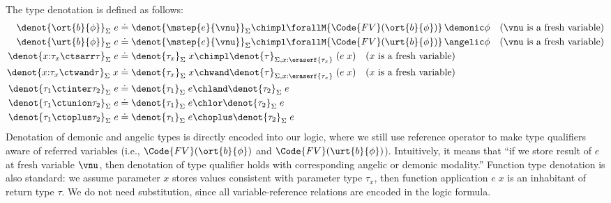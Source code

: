 \begin{definition}
\begin{definition} The type denotation is defined as follows:
\begin{align*}
  \denot{\ort{b}{\phi}}_\Sigma\;e &\doteq \denot{\mstep{e}{\vnu}}_\Sigma \chimpl \forallM{\Code{FV}(\ort{b}{\phi})}\, \demonic \phi \quad \text{($\vnu$ is a fresh variable)}
  \\\denot{\urt{b}{\phi}}_\Sigma\;e &\doteq \denot{\mstep{e}{\vnu}}_\Sigma \chimpl \forallM{\Code{FV}(\urt{b}{\phi})}\, \angelic \phi \quad \text{($\vnu$ is a fresh variable)}
  \\\denot{x{:}\tau_x \ctsarr \tau}_\Sigma\;e &\doteq \denot{\tau_x}_\Sigma\;x \chimpl \denot{\tau}_{\Sigma,x{:}\eraserf{\tau_x}}\;(e\;x) \quad \text{($x$ is a fresh variable)}
  \\\denot{x{:}\tau_x \ctwand \tau}_\Sigma\;x &\doteq \denot{\tau_x}_\Sigma\;x \chwand \denot{\tau}_{\Sigma,x{:}\eraserf{\tau_x}}\;(e\;x) \quad \text{($x$ is a fresh variable)}
  \\\denot{\tau_1 \ctinter \tau_2}_\Sigma\; e &\doteq \denot{\tau_1}_\Sigma\; e \chland \denot{\tau_2}_\Sigma\; e
  \\\denot{\tau_1 \ctunion \tau_2}_\Sigma\; e &\doteq \denot{\tau_1}_\Sigma\; e \chlor \denot{\tau_2}_\Sigma\; e
  \\\denot{\tau_1 \ctoplus \tau_2}_\Sigma\; e &\doteq \denot{\tau_1}_\Sigma\; e \choplus \denot{\tau_2}_\Sigma\; e
\end{align*}\noindent
Denotation of demonic and angelic types is directly encoded into our logic, where we still use reference operator to make type qualifiers aware of referred variables (i.e., $\Code{FV}(\ort{b}{\phi})$ and $\Code{FV}(\urt{b}{\phi})$). Intuitively, it means that ``if we store result of $e$ at fresh variable $\vnu$, then denotation of type qualifier holds with corresponding angelic or demonic modality.'' Function type denotation is also standard: we assume parameter $x$ stores values consistent with parameter type $\tau_x$, then function application $e\;x$ is an inhabitant of return type $\tau$. We do not need substitution, since all variable-reference relations are encoded in the logic formula.
\end{definition}


\end{definition}
